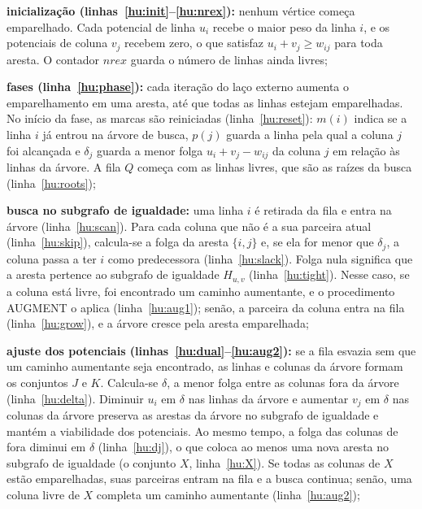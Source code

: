 \begin{alineas}
    \item \textbf{inicialização (linhas~\ref{hu:init}--\ref{hu:nrex}):} nenhum vértice começa emparelhado. Cada potencial de linha $u_i$ recebe o maior peso da linha $i$, e os potenciais de coluna $v_j$ recebem zero, o que satisfaz $u_i + v_j \geq w_{ij}$ para toda aresta. O contador $nrex$ guarda o número de linhas ainda livres;
    \item \textbf{fases (linha~\ref{hu:phase}):} cada iteração do laço externo aumenta o emparelhamento em uma aresta, até que todas as linhas estejam emparelhadas. No início da fase, as marcas são reiniciadas (linha~\ref{hu:reset}): $m(i)$ indica se a linha $i$ já entrou na árvore de busca, $p(j)$ guarda a linha pela qual a coluna $j$ foi alcançada e $\delta_j$ guarda a menor folga $u_i + v_j - w_{ij}$ da coluna $j$ em relação às linhas da árvore. A fila $Q$ começa com as linhas livres, que são as raízes da busca (linha~\ref{hu:roots});
    \item \textbf{busca no subgrafo de igualdade:} uma linha $i$ é retirada da fila e entra na árvore (linha~\ref{hu:scan}). Para cada coluna que não é a sua parceira atual (linha~\ref{hu:skip}), calcula-se a folga da aresta $\{i, j\}$ e, se ela for menor que $\delta_j$, a coluna passa a ter $i$ como predecessora (linha~\ref{hu:slack}). Folga nula significa que a aresta pertence ao subgrafo de igualdade $H_{u,v}$ (linha~\ref{hu:tight}). Nesse caso, se a coluna está livre, foi encontrado um caminho aumentante, e o procedimento AUGMENT o aplica (linha~\ref{hu:aug1}); senão, a parceira da coluna entra na fila (linha~\ref{hu:grow}), e a árvore cresce pela aresta emparelhada;
    \item \textbf{ajuste dos potenciais (linhas~\ref{hu:dual}--\ref{hu:aug2}):} se a fila esvazia sem que um caminho aumentante seja encontrado, as linhas e colunas da árvore formam os conjuntos $J$ e $K$. Calcula-se $\delta$, a menor folga entre as colunas fora da árvore (linha~\ref{hu:delta}). Diminuir $u_i$ em $\delta$ nas linhas da árvore e aumentar $v_j$ em $\delta$ nas colunas da árvore preserva as arestas da árvore no subgrafo de igualdade e mantém a viabilidade dos potenciais. Ao mesmo tempo, a folga das colunas de fora diminui em $\delta$ (linha~\ref{hu:dj}), o que coloca ao menos uma nova aresta no subgrafo de igualdade (o conjunto $X$, linha~\ref{hu:X}). Se todas as colunas de $X$ estão emparelhadas, suas parceiras entram na fila e a busca continua; senão, uma coluna livre de $X$ completa um caminho aumentante (linha~\ref{hu:aug2});

\end{alineas}
